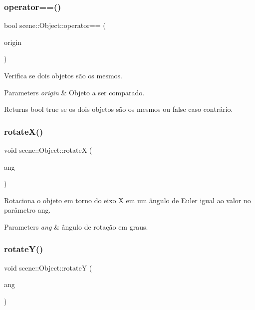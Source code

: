 \subsubsection{\texorpdfstring{operator==()}{operator==()}}
{\footnotesize\ttfamily bool scene\+::\+Object\+::operator== (\begin{DoxyParamCaption}\item[{const \mbox{\hyperlink{classscene_1_1_object}{Object}} \&}]{origin }\end{DoxyParamCaption})\hspace{0.3cm}{\ttfamily [inline]}}

Verifica se dois objetos são os mesmos. 
\begin{DoxyParams}{Parameters}
{\em origin} & Objeto a ser comparado. \\
\hline
\end{DoxyParams}
\begin{DoxyReturn}{Returns}
bool true se os dois objetos são os mesmos ou false caso contrário. 
\end{DoxyReturn}
\mbox{\label{classscene_1_1_object_aa3bc78a375ed8cdcef344770f443ffbb}} 
\subsubsection{\texorpdfstring{rotate\+X()}{rotateX()}}
{\footnotesize\ttfamily void scene\+::\+Object\+::rotateX (\begin{DoxyParamCaption}\item[{G\+Lfloat}]{ang }\end{DoxyParamCaption})\hspace{0.3cm}{\ttfamily [inline]}}

Rotaciona o objeto em torno do eixo X em um ângulo de Euler igual ao valor no parâmetro {\ttfamily ang}. 
\begin{DoxyParams}{Parameters}
{\em ang} & ângulo de rotação em graus. \\
\hline
\end{DoxyParams}
\mbox{\label{classscene_1_1_object_a0fef8a3994b26cb027e9d50eb5baffb5}} 
\subsubsection{\texorpdfstring{rotate\+Y()}{rotateY()}}
{\footnotesize\ttfamily void scene\+::\+Object\+::rotateY (\begin{DoxyParamCaption}\item[{G\+Lfloat}]{ang }\end{DoxyParamCaption})\hspace{0.3cm}{\ttfamily [inline]}}


